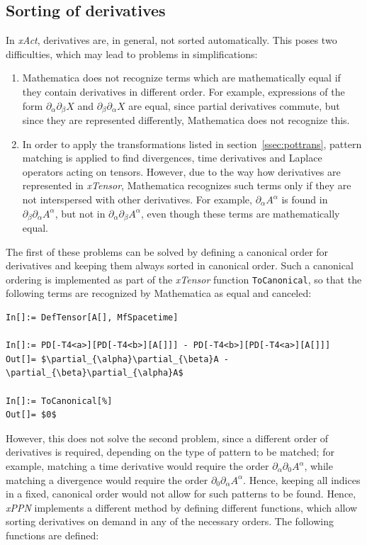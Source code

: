 \documentclass[notitlepage,a4paper,aps,prd,onecolumn,superscriptaddress,nofootinbib,groupedaddress,longbibliography]{revtex4-1}
\newcommand{\xPPN}{\emph{xPPN}}
\newcommand{\xAct}{\emph{xAct}}
\newcommand{\xTensor}{\emph{xTensor}}
\begin{document}
\subsection{Sorting of derivatives}\label{ssec:derivsort}
In \xAct, derivatives are, in general, not sorted automatically. This poses two difficulties, which may lead to problems in simplifications:
\begin{enumerate}
\item
Mathematica does not recognize terms which are mathematically equal if they contain derivatives in different order. For example, expressions of the form \(\partial_{\alpha}\partial_{\beta}X\) and \(\partial_{\beta}\partial_{\alpha}X\) are equal, since partial derivatives commute, but since they are represented differently, Mathematica does not recognize this.

\item
In order to apply the transformations listed in section~\ref{ssec:pottrans}, pattern matching is applied to find divergences, time derivatives and Laplace operators acting on tensors. However, due to the way how derivatives are represented in \xTensor, Mathematica recognizes such terms only if they are not interspersed with other derivatives. For example, \(\partial_{\alpha}A^{\alpha}\) is found in \(\partial_{\beta}\partial_{\alpha}A^{\alpha}\), but not in \(\partial_{\alpha}\partial_{\beta}A^{\alpha}\), even though these terms are mathematically equal.
\end{enumerate}

The first of these problems can be solved by defining a canonical order for derivatives and keeping them always sorted in canonical order. Such a canonical ordering is implemented as part of the \xTensor{} function \lstinline/ToCanonical/, so that the following terms are recognized by Mathematica as equal and canceled:

\begin{lstlisting}
In[]:= DefTensor[A[], MfSpacetime]

In[]:= PD[-T4<a>][PD[-T4<b>][A[]]] - PD[-T4<b>][PD[-T4<a>][A[]]]
Out[]= $\partial_{\alpha}\partial_{\beta}A - \partial_{\beta}\partial_{\alpha}A$

In[]:= ToCanonical[%]
Out[]= $0$
\end{lstlisting}

However, this does not solve the second problem, since a different order of derivatives is required, depending on the type of pattern to be matched; for example, matching a time derivative would require the order \(\partial_{\alpha}\partial_0A^{\alpha}\), while matching a divergence would require the order \(\partial_0\partial_{\alpha}A^{\alpha}\). Hence, keeping all indices in a fixed, canonical order would not allow for such patterns to be found. Hence, \xPPN{} implements a different method by defining different functions, which allow sorting derivatives on demand in any of the necessary orders. The following functions are defined:
\end{document}
